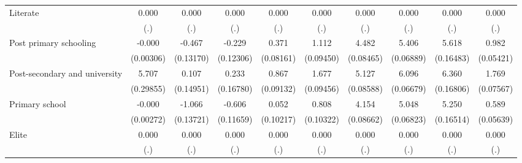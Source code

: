 {\begin{tabular}{l*{9}{c}}
Literate            &       0.000         &       0.000         &       0.000         &       0.000         &       0.000         &       0.000         &       0.000         &       0.000         &       0.000         \\
                    &         (.)         &         (.)         &         (.)         &         (.)         &         (.)         &         (.)         &         (.)         &         (.)         &         (.)         \\
Post primary schooling&      -0.000         &      -0.467\sym{***}&      -0.229         &       0.371\sym{***}&       1.112\sym{***}&       4.482\sym{***}&       5.406\sym{***}&       5.618\sym{***}&       0.982\sym{***}\\
                    &   (0.00306)         &   (0.13170)         &   (0.12306)         &   (0.08161)         &   (0.09450)         &   (0.08465)         &   (0.06889)         &   (0.16483)         &   (0.05421)         \\
Post-secondary and university&       5.707\sym{***}&       0.107         &       0.233         &       0.867\sym{***}&       1.677\sym{***}&       5.127\sym{***}&       6.096\sym{***}&       6.360\sym{***}&       1.769\sym{***}\\
                    &   (0.29855)         &   (0.14951)         &   (0.16780)         &   (0.09132)         &   (0.09456)         &   (0.08588)         &   (0.06679)         &   (0.16806)         &   (0.07567)         \\
Primary school      &      -0.000         &      -1.066\sym{***}&      -0.606\sym{***}&       0.052         &       0.808\sym{***}&       4.154\sym{***}&       5.048\sym{***}&       5.250\sym{***}&       0.589\sym{***}\\
                    &   (0.00272)         &   (0.13721)         &   (0.11659)         &   (0.10217)         &   (0.10322)         &   (0.08662)         &   (0.06823)         &   (0.16514)         &   (0.05639)         \\
Elite               &       0.000         &       0.000         &       0.000         &       0.000         &       0.000         &       0.000         &       0.000         &       0.000         &       0.000         \\
                    &         (.)         &         (.)         &         (.)         &         (.)         &         (.)         &         (.)         &         (.)         &         (.)         &         (.)         \\

\end{tabular}}
